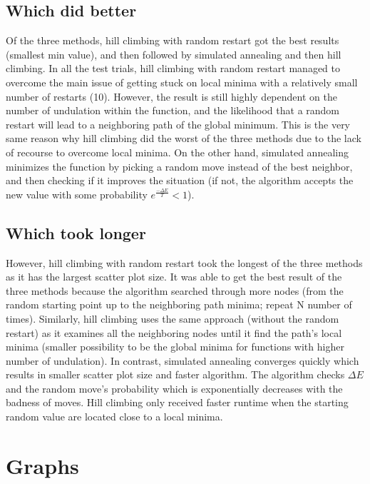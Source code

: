 \documentclass{article}
\begin{document}
  \subsection{Which did better}
  Of the three methods, hill climbing with random restart got the best results (smallest min value), and then followed by simulated annealing and then hill climbing. In all the test trials, hill climbing with random restart managed to overcome the main issue of getting stuck on local minima with a relatively small number of restarts (10). However, the result is still highly dependent on the number of undulation within the function, and the likelihood that a random restart will lead to a neighboring path of the global minimum. This is the very same reason why hill climbing did the worst of the three methods due to the lack of recourse to overcome local minima. On the other hand, simulated annealing minimizes the function by picking a random move instead of the best neighbor, and then checking if it improves the situation (if not, the algorithm accepts the new value with some probability $e^\frac{-\Delta E}{T} < 1$).\\
 
 \subsection{Which took longer}
 However, hill climbing with random restart took the longest of the three methods as it has the largest scatter plot size. It was able to get the best result of the three methods because the algorithm searched through more nodes (from the random starting point up to the neighboring path minima; repeat N number of times). Similarly, hill climbing uses the same approach (without the random restart) as it examines all the neighboring nodes until it find the path's local minima (smaller possibility to be the global minima for functions with higher number of undulation). In contrast, simulated annealing converges quickly which results in smaller scatter plot size and faster algorithm. The algorithm checks $\Delta E$ and the random move's probability which is exponentially decreases with the badness of moves. Hill climbing only received faster runtime when the starting random value are located close to a local minima.
  
  \newpage
  
 \section{Graphs}
 
\end{document}
